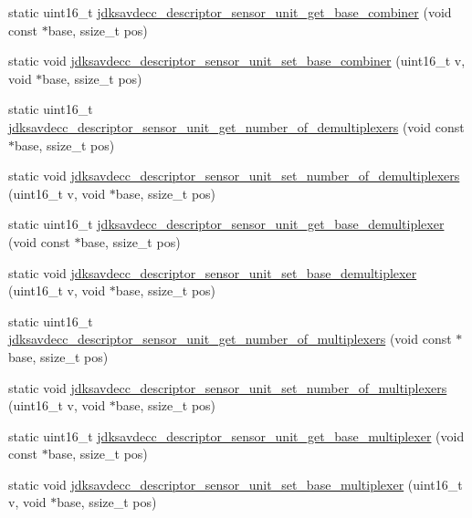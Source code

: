 \begin{DoxyCompactItemize}
\item 
static uint16\+\_\+t \hyperlink{group__descriptor__sensor_ga7edab4d075ad5b612ee5bb7013d329bd}{jdksavdecc\+\_\+descriptor\+\_\+sensor\+\_\+unit\+\_\+get\+\_\+base\+\_\+combiner} (void const $\ast$base, ssize\+\_\+t pos)
\item 
static void \hyperlink{group__descriptor__sensor_gaba01d362ce2850a89464aea2de9e1880}{jdksavdecc\+\_\+descriptor\+\_\+sensor\+\_\+unit\+\_\+set\+\_\+base\+\_\+combiner} (uint16\+\_\+t v, void $\ast$base, ssize\+\_\+t pos)
\item 
static uint16\+\_\+t \hyperlink{group__descriptor__sensor_ga3764008e0e0150df4b81cee3b5d2482e}{jdksavdecc\+\_\+descriptor\+\_\+sensor\+\_\+unit\+\_\+get\+\_\+number\+\_\+of\+\_\+demultiplexers} (void const $\ast$base, ssize\+\_\+t pos)
\item 
static void \hyperlink{group__descriptor__sensor_ga8fd246a13151d4baea210d8a168a908b}{jdksavdecc\+\_\+descriptor\+\_\+sensor\+\_\+unit\+\_\+set\+\_\+number\+\_\+of\+\_\+demultiplexers} (uint16\+\_\+t v, void $\ast$base, ssize\+\_\+t pos)
\item 
static uint16\+\_\+t \hyperlink{group__descriptor__sensor_ga95f02c446b7f305e03d5c82e5259e360}{jdksavdecc\+\_\+descriptor\+\_\+sensor\+\_\+unit\+\_\+get\+\_\+base\+\_\+demultiplexer} (void const $\ast$base, ssize\+\_\+t pos)
\item 
static void \hyperlink{group__descriptor__sensor_ga618ca6606296384e01b25ffb2004c3c9}{jdksavdecc\+\_\+descriptor\+\_\+sensor\+\_\+unit\+\_\+set\+\_\+base\+\_\+demultiplexer} (uint16\+\_\+t v, void $\ast$base, ssize\+\_\+t pos)
\item 
static uint16\+\_\+t \hyperlink{group__descriptor__sensor_ga3771fa5df1f3944f26d1ea25018aca52}{jdksavdecc\+\_\+descriptor\+\_\+sensor\+\_\+unit\+\_\+get\+\_\+number\+\_\+of\+\_\+multiplexers} (void const $\ast$base, ssize\+\_\+t pos)
\item 
static void \hyperlink{group__descriptor__sensor_ga8d851e7d93a4ed65485595e112071c0e}{jdksavdecc\+\_\+descriptor\+\_\+sensor\+\_\+unit\+\_\+set\+\_\+number\+\_\+of\+\_\+multiplexers} (uint16\+\_\+t v, void $\ast$base, ssize\+\_\+t pos)
\item 
static uint16\+\_\+t \hyperlink{group__descriptor__sensor_ga5425485c446ab6df5c5dd42afc58d4e2}{jdksavdecc\+\_\+descriptor\+\_\+sensor\+\_\+unit\+\_\+get\+\_\+base\+\_\+multiplexer} (void const $\ast$base, ssize\+\_\+t pos)
\item 
static void \hyperlink{group__descriptor__sensor_gacc1a2b6c41bc416766e84fdca64c7dc4}{jdksavdecc\+\_\+descriptor\+\_\+sensor\+\_\+unit\+\_\+set\+\_\+base\+\_\+multiplexer} (uint16\+\_\+t v, void $\ast$base, ssize\+\_\+t pos)

\end{DoxyCompactItemize}
